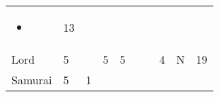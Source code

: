 \documentclass[12pt]{article}
\newcommand{\indexClass}[1]{\index{#1}}
\newcommand{\class}[1]{#1\indexClass{#1}}
\begin{document}
\begin{longtable}[]{@{}llllllllll@{}}
\begin{minipage}[t]{0.07\columnwidth}
\begin{itemize}
\item
\end{itemize}
\strut\end{minipage} &
\begin{minipage}[t]{0.08\columnwidth}\raggedright\strut
13
\strut\end{minipage}\tabularnewline
\begin{minipage}[t]{0.13\columnwidth}\raggedright\strut
\class{Lord}
\strut\end{minipage} &
\begin{minipage}[t]{0.06\columnwidth}\raggedright\strut
5
\strut\end{minipage} &
\begin{minipage}[t]{0.06\columnwidth}\raggedright\strut
\strut\end{minipage} &
\begin{minipage}[t]{0.06\columnwidth}\raggedright\strut
5
\strut\end{minipage} &
\begin{minipage}[t]{0.06\columnwidth}\raggedright\strut
5
\strut\end{minipage} &
\begin{minipage}[t]{0.06\columnwidth}\raggedright\strut
\strut\end{minipage} &
\begin{minipage}[t]{0.06\columnwidth}\raggedright\strut
\strut\end{minipage} &
\begin{minipage}[t]{0.06\columnwidth}\raggedright\strut
4
\strut\end{minipage} &
\begin{minipage}[t]{0.07\columnwidth}\raggedright\strut
N
\strut\end{minipage} &
\begin{minipage}[t]{0.08\columnwidth}\raggedright\strut
19
\strut\end{minipage}\tabularnewline
\begin{minipage}[t]{0.13\columnwidth}\raggedright\strut
\class{Samurai}
\strut\end{minipage} &
\begin{minipage}[t]{0.06\columnwidth}\raggedright\strut
5
\strut\end{minipage} &
\begin{minipage}[t]{0.06\columnwidth}\raggedright\strut
1
\strut\end{minipage} &
\begin{minipage}[t]{0.06\columnwidth}\raggedright\strut
\strut\end{minipage} &

\end{longtable}
\end{document}
